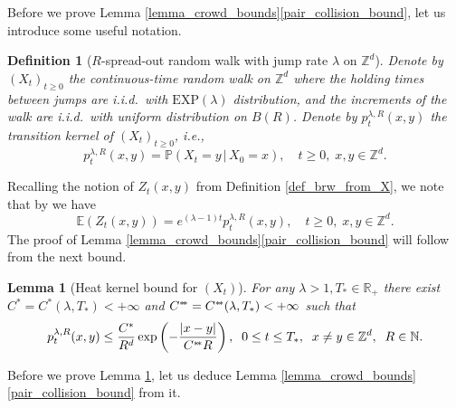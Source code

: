 \documentclass[a4paper,12pt]{article}
\newtheorem  {lemma}         [theorem]{Lemma}
\newtheorem  {definition}    [theorem]{Definition}
\newcommand{\sstar}{* \hspace{-.05cm} *}
\begin{document}
Before we prove Lemma \ref{lemma_crowd_bounds}\eqref{pair_collision_bound}, let us introduce some useful notation.

\begin{definition}[$R$-spread-out random walk  with jump rate $\lambda$ on $\mathbb{Z}^d$]\label{def_R_spread_out_rw}
 Denote by
 $(X_t)_{t\geq 0}$ the  continuous-time random walk on $\mathbb{Z}^d$ where the holding times between jumps
 are i.i.d.\ with $\mathrm{EXP}(\lambda)$ distribution, and the increments of the walk are i.i.d.\ with uniform distribution on $B(R)$.
  Denote by $p^{\lambda,R}_{t}(x,y)$ the transition kernel of $(X_t)_{t\geq 0}$, i.e.,
  \begin{equation}\label{cont_time_tr_k_def}
  p^{\lambda,R}_{t}(x,y)=\mathbb{P}(X_t=y \, | \, X_0=x ), \quad t \geq 0, \; x,y \in \mathbb{Z}^d.
  \end{equation}
 \end{definition}
Recalling the notion of  $Z_t(x,y)$ from Definition \ref{def_brw_from_X}, we note that by \cite[Proposition 1.21]{Li99} we have
 \begin{equation}\label{rw_brw_expect_correspond}
   \mathbb{E}(Z_t(x,y))= e^{(\lambda-1)t} p^{\lambda,R}_{t}(x,y),  \quad t \geq 0, \; x,y \in \mathbb{Z}^d.
 \end{equation}
The proof of Lemma \ref{lemma_crowd_bounds}\eqref{pair_collision_bound} will follow from the next bound.

\begin{lemma}[Heat kernel bound for $(X_t)$]
\label{lemma_heat_kernel_bound_cont}
 For any  $\lambda>1, T_* \in \mathbb{R}_+$ there exist $C^*=C^*(\lambda,T_*)<+\infty$ and $C^{\sstar}=C^{\sstar}(\lambda,T_*)<+\infty$ such that
\begin{equation}\label{heat_kernel_bound_eq_cont}
  p^{\lambda,R}_{t}(x,y) \leq   \frac{C^*}{R^{d}}  \exp\left(  -  \frac{|x-y|}{C^{\sstar} R } \right), \; \; 0 \leq t \leq T_*, \; \;   x \neq y  \in \mathbb{Z}^d, \; \; R \in \mathbb{N}.
\end{equation}
\end{lemma}

Before we prove Lemma \ref{lemma_heat_kernel_bound_cont}, let us deduce Lemma \ref{lemma_crowd_bounds}\eqref{pair_collision_bound} from it.
\end{document}
